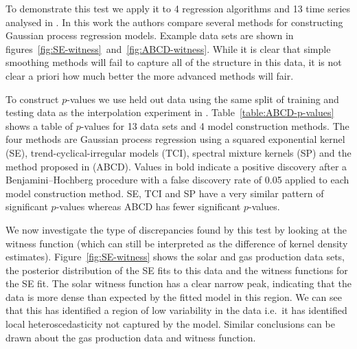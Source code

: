 \documentclass{article} %
\def\ie{i.e.\ }
\begin{document}
To demonstrate this test we apply it to 4 regression algorithms and 13 time series analysed in \cite{Lloyd2014-ABCD}.
In this work the authors compare several methods for constructing Gaussian process \citep[e.g.][]{Rasmussen2006-ml} regression models.
Example data sets are shown in figures~\ref{fig:SE-witness}~and~\ref{fig:ABCD-witness}.
While it is clear that simple smoothing methods will fail to capture all of the structure in this data, it is not clear a priori how much better the more advanced methods will fair.

To construct $p$-values we use held out data using the same split of training and testing data as the interpolation experiment in \cite{Lloyd2014-ABCD}\footnotemark.
Table~\ref{table:ABCD-p-values} shows a table of $p$-values for 13 data sets and 4 model construction methods.
The four methods are Gaussian process regression using a squared exponential kernel (SE), trend-cyclical-irregular models \citep[e.g.][]{lind2006basic} (TCI), spectral mixture kernels \citep{WilAda13} (SP) and the method proposed in \cite{Lloyd2014-ABCD} (ABCD).
Values in  bold indicate a positive discovery after a Benjamini--Hochberg \citep{Benjamini_undated-mh} procedure with a false discovery rate of 0.05 applied to each model construction method.
SE, TCI and SP have a very similar pattern of significant $p$-values whereas ABCD has fewer significant $p$-values.

We now investigate the type of discrepancies found by this test by looking at the witness function (which can still be interpreted as the difference of kernel density estimates).
Figure~\ref{fig:SE-witness} shows the solar and gas production data sets, the posterior distribution of the SE fits to this data and the witness functions for the SE fit.
The solar witness function has a clear narrow peak, indicating that the data is more dense than expected by the fitted model in this region.
We can see that this has identified a region of low variability in the data \ie it has identified local heteroscedasticity not captured by the model.
Similar conclusions can be drawn about the gas production data and witness function.
\end{document}

